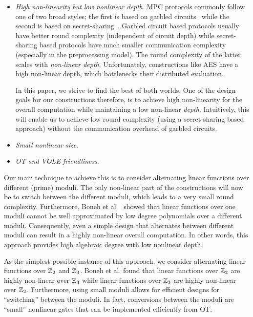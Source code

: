 \begin{itemize}
    \item \textit{High non-linearity but low nonlinear depth}.
    MPC protocols commonly follow one of two broad styles; the first is based on garbled circuits~\cite{} while the second is based on secret-sharing~\cite{}. Garbled circuit based protocols usually have better round complexity (independent of circuit depth) while secret-sharing based protocols have much smaller communication complexity (especially in the preprocessing model). The round complexity of the latter scales with \textit{non-linear depth}. Unfortunately, constructions like AES have a high non-linear depth, which bottlenecks their distributed evaluation.

    \hspace*{1em} In this paper, we strive to find the best of both worlds. One of the design goals for our constructions therefore, is to achieve high non-linearity for the overall computation while maintaining a low non-linear \textit{depth}. Intuitively, this will enable us to achieve low round complexity (using a secret-sharing based approach) without the communication overhead of garbled circuits.

    \item \textit{Small nonlinear size}.
    
    \item \textit{\textnormal{OT} and \textnormal{VOLE} friendliness}.


\end{itemize}
Our main technique to achieve this is to consider alternating linear functions over different (prime) moduli. The only non-linear part of the constructions will now be to switch between the different moduli, which leads to a very small round complexity. Furthermore, Boneh et al.~\cite{boneh2018-darkmatter} showed that linear functions over one moduli cannot be well approximated by low degree polynomials over a different moduli. Consequently, even a simple design that alternates between different moduli can result in a highly non-linear overall computation. In other words, this approach provides high algebraic degree with low nonlinear depth. 

As the simplest possible instance of this approach, we consider alternating linear functions over $\mathbb{Z}_2$ and $\mathbb{Z}_3$. Boneh et al. found that linear functions over $\mathbb{Z}_2$ are highly non-linear over $\mathbb{Z}_3$ while linear functions over $\mathbb{Z}_3$ are highly non-linear over $\mathbb{Z}_2$. Furthermore, using small moduli allows for efficient designs for ``switching'' between the moduli. In fact, conversions between the moduli are “small” nonlinear gates that can be implemented efficiently from OT.




